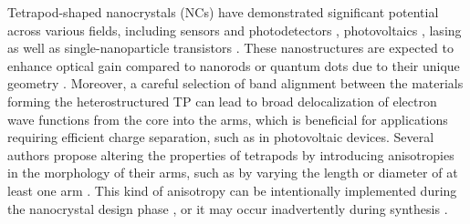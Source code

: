 \documentclass[nanomaterials,article,submit,moreauthors,pdftex]{Definitions/mdpi}
\begin{document}

Tetrapod-shaped nanocrystals (NCs) have demonstrated significant potential across various fields, including  sensors and photodetectors \cite{Mishra2016, Raja2016}, photovoltaics \cite{Yan2015, Yang2016, Lee2009}, lasing \cite{Liao2012} as well as single-nanoparticle transistors \cite{Cui2005}. These nanostructures are expected to enhance optical gain compared to nanorods or quantum dots due to their unique geometry \cite{Liao2012, Zavelani2010}. Moreover, a careful selection of band alignment between the materials forming the heterostructured TP can lead to broad delocalization of electron wave functions from the core into the arms, which is beneficial for applications requiring efficient charge separation, such as in photovoltaic devices. Several authors propose altering the properties of tetrapods by introducing anisotropies in the morphology of their arms, such as by varying the length or diameter of at least one arm \cite{Califano2022, Koh2022, Llusar2022}. This kind of anisotropy can be intentionally implemented during the nanocrystal design phase \cite{Wang2019, Koh2022}, or it may occur inadvertently during synthesis \cite{Talapin2007, Mauser2008}.
\end{document}
